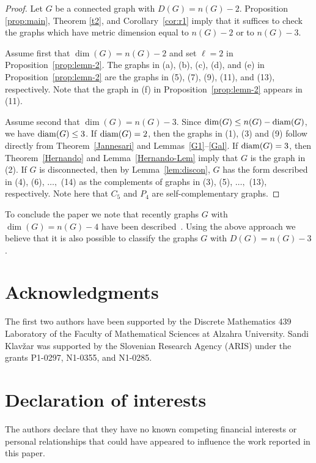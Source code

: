 \documentclass[12pt]{article}
\DeclareMathOperator {\diam} {{\rm diam}}
\begin{document}
\begin{proof}
Let $G$ be a connected graph with $D(G)=n(G)-2$. Proposition \ref{prop:main}, Theorem \ref{t2}, and Corollary~\ref{cor:r1} imply that it suffices to check the graphs which have metric dimension equal to $n(G)-2$ or to $n(G)-3$. 

Assume first that $\dim(G)=n(G)-2$ and set $\ell=2$ in Proposition~\ref{prop:lemn-2}. 
The graphs in (a), (b), (c), (d), and (e) in Proposition~\ref{prop:lemn-2} are the graphs in (5), (7), (9), (11), and (13), respectively. Note that the graph in (f) in Proposition~\ref{prop:lemn-2} appears in (11). 

Assume second that $\dim(G)=n(G)-3$. Since $\dim(G) \leq n(G)- \diam(G)$, we have ${\rm diam}(G)\leq 3$. 
If ${\rm diam}(G)=2$, then the graphs in (1), (3) and (9) follow directly from Theorem~\ref{Jannesari} and Lemmas~\ref{G1}--\ref{Gal}.
If ${\rm diam}(G)=3$, then Theorem~\ref{Hernando} and Lemma~\ref{Hernando-Lem} imply that $G$ is the graph in (2). If $G$ is disconnected, then by Lemma~\ref{lem:discon}, $G$ has the form described in (4), (6), $\ldots ,$ (14) as the complements of graphs in (3), (5), $\ldots ,$ (13), respectively. Note here that $C_5$ and $P_4$ are self-complementary graphs.
\end{proof}

To conclude the paper we note that recently graphs $G$ with $\dim(G) = n(G) - 4$ have been described~\cite{dim n-4}. Using the above approach we believe that it is also possible to classify the graphs $G$ with $D(G)=n(G)-3$.  

\section*{Acknowledgments}
The first two authors have been supported by the Discrete Mathematics
439 Laboratory of the Faculty of Mathematical Sciences at Alzahra University. 
Sandi Klav\v{z}ar was supported by the Slovenian Research Agency (ARIS) under the grants P1-0297, N1-0355, and N1-0285.

\section*{Declaration of interests}

The authors declare that they have no known competing financial interests or personal relationships that could have appeared to influence the work reported in this paper.
\end{document}
